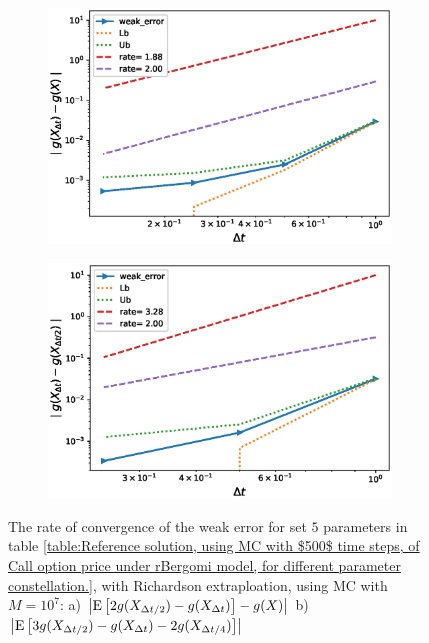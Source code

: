 \documentclass[11pt]{article}
\newcommand{\expt}[1]{\mathrm{E}\left[#1\right]}
\begin{document}
\begin{figure}[!htbp]
	\centering
	\begin{subfigure}{.4\textwidth}
		\centering
		\includegraphics[width=1\linewidth]{./figures/rBergomi_weak_error_rates/with_richardson/H_002/weak_convergence_order_Bergomi_H_002_K_1_M_1_10_7_richardson_relative}
		\caption{}
		\label{fig:sub3}
	\end{subfigure}%
	\begin{subfigure}{.4\textwidth}
		\centering
		\includegraphics[width=1\linewidth]{./figures/rBergomi_weak_error_rates/with_richardson/H_002/weak_convergence_order_differences_Bergomi_H_002_K_1_M_1_10_7_richardson_relative}
		\caption{}
		\label{fig:sub4}
	\end{subfigure}
	
	\caption{The rate of convergence of the weak error for set $5$ parameters in table \ref{table:Reference solution, using MC with $500$ time steps, of Call option price under rBergomi model, for different parameter constellation.}, with Richardson extraploation, using MC with $M=10^7$: a) $\abs{\expt{2 g(X_{\Delta t/2}) -g(X_{\Delta t})}-g(X)}$  b) $\abs{\expt{3 g(X_{\Delta t/2})-g(X_{\Delta t})-2 g(X_{\Delta t/4})}}$ }
	\label{fig:Weak_rate_H_002_with_rich_K1}
\end{figure}
\FloatBarrier
\end{document}

